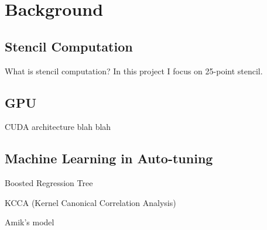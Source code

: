 \section{Background}
\subsection{Stencil Computation}
What is stencil computation?
In this project I focus on 25-point stencil.

\subsection{GPU}
CUDA architecture blah blah

\subsection{Machine Learning in Auto-tuning}
Boosted Regression Tree

KCCA (Kernel Canonical Correlation Analysis)

Amik's model
